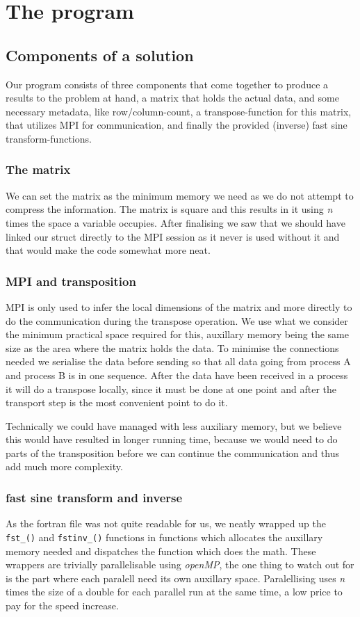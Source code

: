\newpage
\section{The program}
\subsection{Components of a solution}
Our program consists of three components that come together to produce a
results to the problem at hand, a matrix that holds the actual data, and some
necessary metadata, like row/column-count, a transpose-function for this
matrix, that utilizes MPI for communication, and finally the provided (inverse)
fast sine transform-functions.

\subsubsection{The matrix}
We can set the matrix as the minimum memory we need as we do not attempt to
compress the information. The matrix is square and this results in it using
\emph{n} times the space a variable occupies. After finalising we saw that we
should have linked our struct directly to the MPI session as it never is used
without it and that would make the code somewhat more neat. 

\subsubsection{MPI and transposition}
MPI is only used to infer the local dimensions of the matrix and more directly
to do the communication during the transpose operation. We use what we consider
the minimum practical space required for this, auxillary memory being the same
size as the area where the matrix holds the data. To minimise the connections
needed we serialise the data before sending so that all data going from process
A and process B is in one sequence. After the data have been received in a
process it will do a transpose locally, since it must be done at one point and
after the transport step is the most convenient point to do it. 

Technically we could have managed with less auxiliary memory, but we believe
this would have resulted in longer running time, because we would need to do
parts of the transposition before we can continue the communication and thus
add much more complexity. 

\subsubsection{fast sine transform and inverse }
As the fortran file was not quite readable for us, we neatly wrapped up the
\texttt{fst\_()} and \texttt{fstinv\_()} functions in functions which allocates the
auxillary memory needed and dispatches the function which does the math. These
wrappers are trivially parallelisable using \emph{openMP}, the one thing to
watch out for is the part where each paralell need its own auxillary space.
Paralellising uses \emph{n} times the size of a double for each parallel run at
the same time, a low price to pay for the speed increase. 


